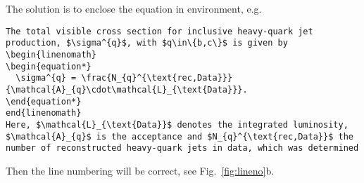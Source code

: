 The solution is to enclose the equation in  environment, e.g.
\begin{verbatim}
The total visible cross section for inclusive heavy-quark jet
production, $\sigma^{q}$, with $q\in\{b,c\}$ is given by
\begin{linenomath}
\begin{equation*}
  \sigma^{q} = \frac{N_{q}^{\text{rec,Data}}}{\mathcal{A}_{q}\cdot\mathcal{L}_{\text{Data}}}.
\end{equation*}
end{linenomath}
Here, $\mathcal{L}_{\text{Data}}$ denotes the integrated luminosity,
$\mathcal{A}_{q}$ is the acceptance and $N_{q}^{\text{rec,Data}}$ the
number of reconstructed heavy-quark jets in data, which was determined
\end{verbatim}

Then the line numbering will be correct, see Fig.~\ref{fig:lineno}b.

